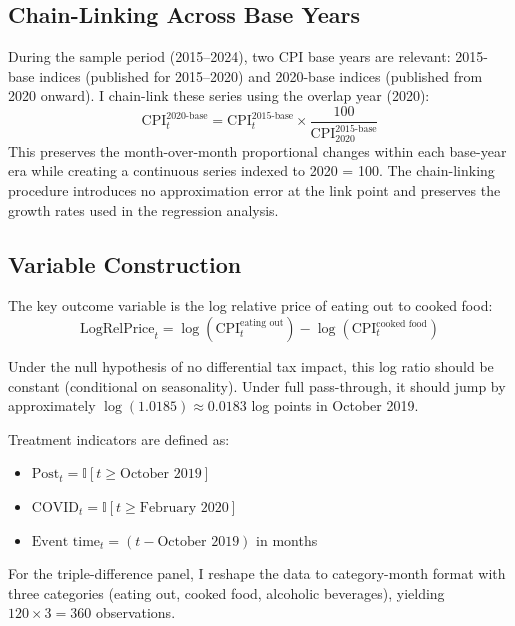 \documentclass[12pt]{article}
\newcommand{\ind}{\mathbb{I}}
\begin{document}
\subsection{Chain-Linking Across Base Years}

During the sample period (2015--2024), two CPI base years are relevant: 2015-base indices (published for 2015--2020) and 2020-base indices (published from 2020 onward). I chain-link these series using the overlap year (2020):
\begin{equation}
\text{CPI}_{t}^{\text{2020-base}} = \text{CPI}_{t}^{\text{2015-base}} \times \frac{100}{\text{CPI}_{2020}^{\text{2015-base}}}
\end{equation}
This preserves the month-over-month proportional changes within each base-year era while creating a continuous series indexed to 2020 = 100. The chain-linking procedure introduces no approximation error at the link point and preserves the growth rates used in the regression analysis.

\subsection{Variable Construction}

The key outcome variable is the log relative price of eating out to cooked food:
\begin{equation}
\text{LogRelPrice}_t = \log(\text{CPI}_{t}^{\text{eating out}}) - \log(\text{CPI}_{t}^{\text{cooked food}})
\end{equation}

Under the null hypothesis of no differential tax impact, this log ratio should be constant (conditional on seasonality). Under full pass-through, it should jump by approximately $\log(1.0185) \approx 0.0183$ log points in October 2019.

Treatment indicators are defined as:
\begin{itemize}
\item $\text{Post}_t = \ind[t \geq \text{October 2019}]$
\item $\text{COVID}_t = \ind[t \geq \text{February 2020}]$
\item $\text{Event time}_t = (t - \text{October 2019})$ in months
\end{itemize}

For the triple-difference panel, I reshape the data to category-month format with three categories (eating out, cooked food, alcoholic beverages), yielding $120 \times 3 = 360$ observations.
\end{document}
